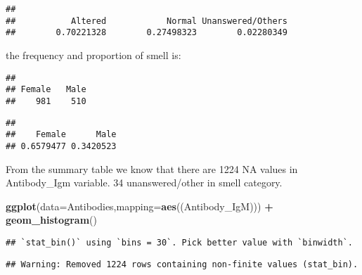 \documentclass[]{article}
\newenvironment{Shaded}{\begin{snugshade}}{\end{snugshade}}
\newcommand{\CommentTok}[1]{\textcolor[rgb]{0.56,0.35,0.01}{\textit{#1}}}
\newcommand{\DataTypeTok}[1]{\textcolor[rgb]{0.13,0.29,0.53}{#1}}
\newcommand{\KeywordTok}[1]{\textcolor[rgb]{0.13,0.29,0.53}{\textbf{#1}}}
\newcommand{\NormalTok}[1]{#1}
\newcommand{\OperatorTok}[1]{\textcolor[rgb]{0.81,0.36,0.00}{\textbf{#1}}}
\newcommand{\StringTok}[1]{\textcolor[rgb]{0.31,0.60,0.02}{#1}}
\begin{document}
\begin{verbatim}
## 
##           Altered            Normal Unanswered/Others 
##        0.70221328        0.27498323        0.02280349
\end{verbatim}

the frequency and proportion of smell is:

\begin{Shaded}
\end{Shaded}

\begin{verbatim}
## 
## Female   Male 
##    981    510
\end{verbatim}

\begin{Shaded}
\end{Shaded}

\begin{verbatim}
## 
##    Female      Male 
## 0.6579477 0.3420523
\end{verbatim}

From the summary table we know that there are 1224 NA values in
Antibody\_Igm variable. 34 unanswered/other in smell category.

\begin{Shaded}
\begin{Highlighting}[]
\KeywordTok{ggplot}\NormalTok{(}\DataTypeTok{data=}\NormalTok{Antibodies,}\DataTypeTok{mapping=}\KeywordTok{aes}\NormalTok{((Antibody_IgM))) }\OperatorTok{+}\StringTok{ }\KeywordTok{geom_histogram}\NormalTok{()}
\end{Highlighting}
\end{Shaded}

\begin{verbatim}
## `stat_bin()` using `bins = 30`. Pick better value with `binwidth`.
\end{verbatim}

\begin{verbatim}
## Warning: Removed 1224 rows containing non-finite values (stat_bin).
\end{verbatim}
\end{document}
